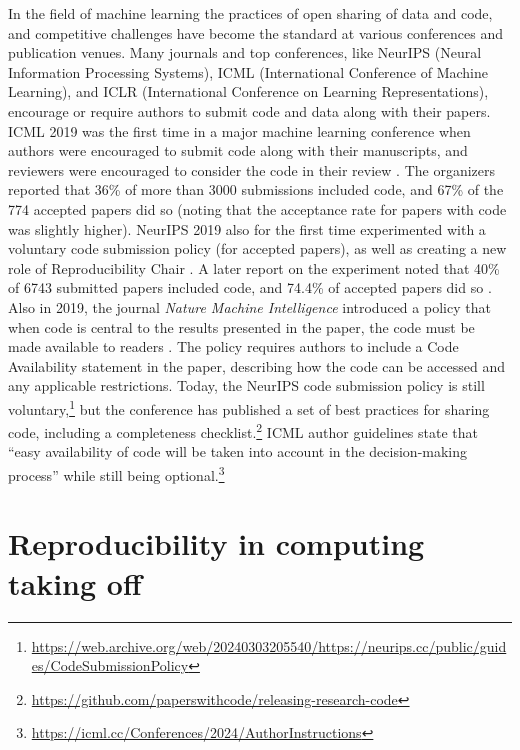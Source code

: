 \documentclass[]{hdsr}
\begin{document}
In the field of machine learning the practices of open sharing of data and code, and competitive challenges have become the standard at various conferences and publication venues.
Many journals and top conferences, like NeurIPS (Neural Information Processing Systems), ICML (International Conference of Machine Learning), and ICLR (International Conference on Learning Representations), encourage or require authors to submit code and data along with their papers. 
ICML 2019 was the first time in a major machine learning conference when authors were encouraged to submit code along with their manuscripts, and reviewers were encouraged to consider the code in their review \citep{chaudhuri2019}.
The organizers reported that  36\% of more than 3000 submissions included code, and 67\% of the 774 accepted papers did so (noting that the acceptance rate for papers with code was slightly higher).
NeurIPS 2019 also for the first time experimented with a voluntary code submission policy (for accepted papers), as well as creating a new role of Reproducibility Chair \citep{pineau2019neurips}. A later report on the experiment noted that 40\% of 6743 submitted papers included code, and 74.4\% of accepted papers did so \citep{pineau2021improving}.
Also in 2019, the journal \emph{Nature Machine Intelligence} introduced a policy that when code is central to the results presented in the paper, the code must be made available to readers \citep{editorial2019naturemi}. The policy requires authors to include a Code Availability statement in the paper, describing how the code can be accessed and any applicable restrictions.
Today, the NeurIPS code submission policy is still voluntary,\footnote{\url{https://web.archive.org/web/20240303205540/https://neurips.cc/public/guides/CodeSubmissionPolicy}} but the conference has published a set of best practices for sharing code, including a completeness checklist.\footnote{\url{https://github.com/paperswithcode/releasing-research-code}}
ICML author guidelines state that ``easy availability of code will be taken into account in the decision-making process'' while still being optional.\footnote{\url{https://icml.cc/Conferences/2024/AuthorInstructions}}

\section*{Reproducibility in computing taking off}
\end{document}
